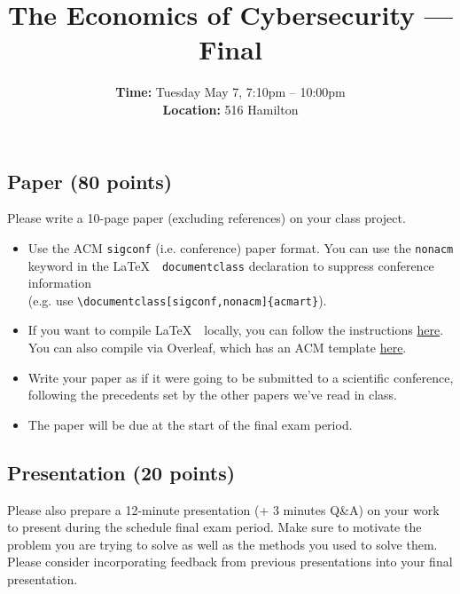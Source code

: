\documentclass[11pt]{article}
\title{The Economics of Cybersecurity --- Final}
\date{{\bf Time:} Tuesday May 7, 7:10pm -- 10:00pm \\ {\bf Location:} 516 Hamilton}
\begin{document}
\maketitle



\subsection*{Paper (80 points)}

Please write a 10-page paper (excluding references) on your class project. 
\begin{itemize}
    \item Use the ACM \texttt{sigconf} (i.e. conference) paper format. You can use the \texttt{nonacm} keyword in the \LaTeX \ \ \texttt{documentclass} declaration to suppress conference information \\ (e.g. use \texttt{\textbackslash documentclass[sigconf,nonacm]\{acmart\}}).
    \item If you want to compile \LaTeX \ \  locally, you can follow the instructions \href{https://www.acm.org/publications/proceedings-template}{here}. You can also compile via Overleaf, which has an ACM template \href{https://www.overleaf.com/latex/templates/association-for-computing-machinery-acm-sig-proceedings-template/bmvfhcdnxfty}{here}.
    \item Write your paper as if it were going to be submitted to a scientific conference, following the precedents set by the other papers we've read in class. 
    \item The paper will be due at the start of the final exam period. 
\end{itemize}

\subsection*{Presentation (20 points)}

Please also prepare a 12-minute presentation (+ 3 minutes Q\&A) on your work to present during the schedule final exam period. Make sure to motivate the problem you are trying to solve as well as the methods you used to solve them. Please consider incorporating feedback from previous presentations into your final presentation.

\end{document}
